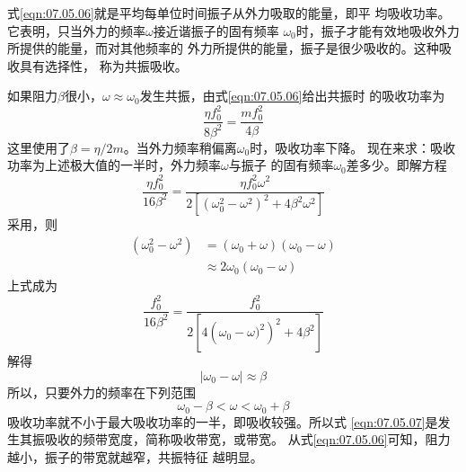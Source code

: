 式\eqref{eqn:07.05.06}就是平均每单位时间振子从外力吸取的能量，即平
均吸收功率。它表明，只当外力的频率$ \omega $接近谐振子的固有频率
$ \omega_{ 0 } $时，振子才能有效地吸收外力所提供的能量，而对其他频率的
外力所提供的能量，振子是很少吸收的。这种吸收具有选择性，
称为共振吸收。

如果阻力$ \beta $很小，$ \omega \approx \omega _ { 0 } $发生共振，由式\eqref{eqn:07.05.06}给出共振时
的吸收功率为\vspace{-0.5em}
\begin{equation*}
    \frac { \eta f _ { 0 } ^ { 2 } } { 8 \beta ^ { 2 } } = \frac { m f _ { 0 } ^ { 2 } } { 4 \beta }
\end{equation*}
这里使用了$ \beta = \eta / 2 m $。当外力频率稍偏离$\omega_{ 0 }$时，吸收功率下降。
现在来求：吸收功率为上述极大值的一半时，外力频率$ \omega $与振子
的固有频率$ \omega_{ 0 } $差多少。即解方程\vspace{-0.2em}
\begin{equation*}
    \frac { \eta f _ { 0 } ^ { 2 } } { 16 \beta ^ { 2 } }  = \frac { \eta f _ { 0 } ^ { 2 } \omega ^ { 2 } } { 2 \left[ \left( \omega_{ 0 } ^ { 2 } - \omega ^ { 2 } \right) ^ { 2 } + 4 \beta ^ { 2 } \omega ^ { 2 } \right] }
\end{equation*}\vspace{-0.3em}
采用，则
\vspace{-0.5em}
\begin{equation*}
    \begin{aligned}
    \left( \omega _ { 0 } ^ { 2 } - \omega ^ { 2 } \right) &= \left( \omega _ { 0 } + \omega \right) \left( \omega _ { 0 } - \omega \right) \\
    &\approx 2 \omega _ { 0 } \left( \omega _ { 0 } - \omega \right)
    \end{aligned}
\end{equation*}
上式成为\vspace{-1.56em}
\begin{equation*}
    \frac { f _ { 0 } ^ { 2 } } { 16 \beta ^ { 2 } }  = \frac { f _ { 0 } ^ { 2 } } { 2 \left[ 4 \left( \omega_{ 0 } - \omega ) ^ { 2 } \right) ^ { 2 } + 4 \beta ^ { 2 } \right] }
\end{equation*}
解得\vspace{-1.56em}
\begin{equation*}
    \left| \omega _ { 0 } - \omega \right| \approx \beta
\end{equation*}
所以，只要外力的频率在下列范围
\begin{equation}\label{eqn:07.05.07}
    \omega _ { 0 } - \beta < \omega < \omega _ { 0 } + \beta
\end{equation}
吸收功率就不小于最大吸收功率的一半，即吸收较强。所以式
\eqref{eqn:07.05.07}是发生其振吸收的频带宽度，简称吸收带宽，或带宽。
从式\eqref{eqn:07.05.06}可知，阻力越小，振子的带宽就越窄，共振特征
越明显。
